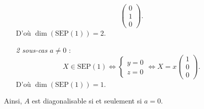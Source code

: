 \begin{enumerate}
\begin{enumerate}
\[\begin{pmatrix}
						0\\1\\0
					\end{pmatrix}
				.\]
				D'où $\dim(\mathrm{SEP}(1)) = 2$.
			\item[\itshape 2\tsup{nd} sous-cas] $a \neq 0$\/ : \[
					X \in \mathrm{SEP}(1) \iff \begin{cases}
						y = 0\\
						z = 0
					\end{cases} \iff X = x\begin{pmatrix}
						1\\0\\0
					\end{pmatrix} 
				.\]
				D'où $\dim(\mathrm{SEP}(1)) = 1$.
		\end{enumerate}
		Ainsi, $A$\/ est diagonalisable si et seulement si $a = 0$.
\end{enumerate}

